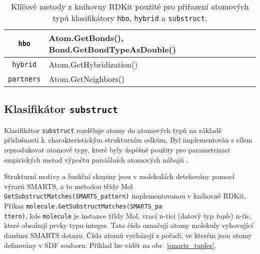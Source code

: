 \begin{table}[h]
\begin{center}
\label{atom_rdkit_methods}
\renewcommand{\arraystretch}{1.3}
    \begin{small}
    \hspace{7mm}\begin{tabular}{c|l}
        \verb|hbo| & Atom.GetBonds(), Bond.GetBondTypeAsDouble() \\
        \hline
        \verb|hybrid| & Atom.GetHybridization() \\
        \hline
        \verb|partners| & Atom.GetNeighbors() \\
    \end{tabular}
    \end{small}
    \caption{Klíčové metody z knihovny RDKit použité pro přiřazení atomových typů klasifikátory \texttt{hbo}, \texttt{hybrid} a \texttt{substruct}.}
\end{center}
\end{table}
\subsection{Klasifikátor \texttt{substruct}}
Klasifikátor \verb|substruct| rozděluje atomy do atomových typů na základě příslušnosti k~charakteristickým strukturním celkům. Byl implementován s cílem reprodukovat atomové typy, které byly úspěšně použity pro parametrizaci empirických metod výpočtu parciálních atomových nábojů \cite{attyp1, attyp2}. 

Strukturní motivy a funkční skupiny jsou v molekulách detekovány pomocí výrazů SMARTS, a to metodou třídy Mol \verb|GetSubstructMatches(SMARTS_pattern)| implementovanou v knihovně RDKit. 
Příkaz \verb|molecule.GetSubstructMatches(SMARTS_pa|\\\verb|ttern)|, kde \verb|molecule| je instance třídy Mol, 
vrací n-tici (datový typ \textit{tuple}) n-tic, které  obsahují prvky typu integer. Tato čísla označují atomy molekuly vyhovující danému SMARTS dotazu. Čísla atomů vycházejí z pořadí, ve kterém jsou atomy definovány v SDF souboru. 
Příklad lze vidět na obr. \ref{smarts_tuples}.


